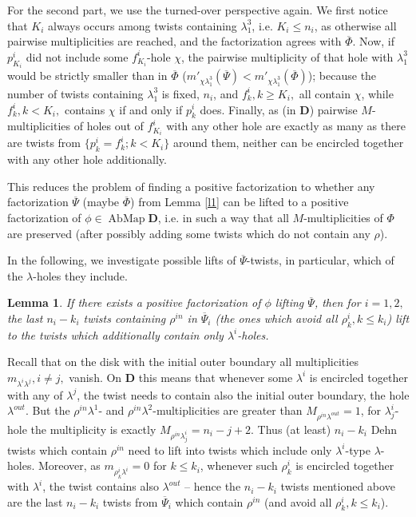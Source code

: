 \documentclass{amsart}
\newtheorem{lem}[thm]{Lemma}
\theoremstyle{definition}
\begin{document}
For the second part, we use the turned-over perspective again. We first notice that $K_i$ always occurs among twists containing $\lambda_1^3$, i.e. $K_i\leq n_i$, as otherwise all pairwise multiplicities are reached, and the factorization agrees with $\overline\Phi$. Now, if $p_{K_i}^i$ did not include some $f_{K_i}^i$-hole $\chi$, the pairwise multiplicity of that hole with $\lambda_1^3$ would be strictly smaller than in $\overline\Phi$ ($m'_{\chi\lambda_1^3}(\overline\Psi)<m'_{\chi\lambda_1^3}(\overline\Phi)$); because the number of twists containing $\lambda_1^3$ is fixed, $n_i$, and $f_k^i,k\geq K_i,$ all contain $\chi$, while $f_k^i,k<K_i,$ contains $\chi$ if and only if $p_k^i$ does. Finally, as (in $\mathbf D$) pairwise $M$-multiplicities of holes out of $f_{K_i}^i$ with any other hole are exactly as many as there are twists from $\{p_k^i=f_k^i;k<K_i\}$ around them, neither can be encircled together with any other hole additionally.
\endproof

This reduces the problem of finding a positive factorization to whether any factorization $\overline{\Psi}$ (maybe $\overline\Phi$) from Lemma \ref{l1} can be lifted to a positive factorization of $\phi\in\operatorname{AbMap} \mathbf D$, i.e. in such a way that all $M$-multiplicities of $\Phi$ are preserved (after possibly adding some twists which do not contain any $\rho$).

In the following, we investigate possible lifts of $\overline\Psi$-twists, in particular, which of the $\lambda$-holes they include.

\begin{lem}\label{l2}
If there exists a positive factorization of $\phi$ lifting $\overline\Psi$, then for $i=1,2,$ the last $n_i-k_i$ twists containing $\rho^{in}$ in $\overline\Psi_i$ (the ones which avoid all $\rho_k^i,k\leq k_i$) lift to the twists which additionally contain only $\lambda^i$-holes.
\end{lem}

\proof
Recall that on the disk with the initial outer boundary all multiplicities $m_{\lambda^i\lambda^j}, i\neq j,$ vanish. On $\mathbf D$ this means that whenever some $\lambda^i$ is encircled together with any of $\lambda^j$, the twist needs to contain also the initial outer boundary, the hole $\lambda^{out}$. But the $\rho^{in}\lambda^1$- and $\rho^{in}\lambda^2$-multiplicities are greater than $M_{\rho^{in}\lambda^{out}}=1$, for $\lambda_j^i$-hole the multiplicity is exactly $M_{\rho^{in}\lambda_j^i}=n_i-j+2$. Thus (at least) $n_i-k_i$ Dehn twists which contain $\rho^{in}$ need to lift into twists which include only $\lambda^i$-type $\lambda$-holes. Moreover, as $m_{\rho_k^i\lambda^i}=0$ for $k\leq k_i$, whenever such $\rho_k^i$ is encircled together with $\lambda^i$, the twist contains also $\lambda^{out}$ -- hence the $n_i-k_i$ twists mentioned above are the last $n_i-k_i$ twists from $\overline\Psi_i$ which contain $\rho^{in}$ (and avoid all $\rho_k^i,k\leq k_i$).
\endproof
\end{document}
